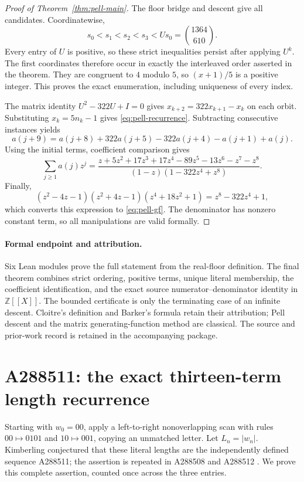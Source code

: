 \documentclass[11pt]{article}
\newcommand{\Z}{\mathbb Z}
\begin{document}
\begin{proof}[Proof of Theorem~\ref{thm:pell-main}]
The floor bridge and descent give all candidates. Coordinatewise,
\[
 s_0<s_1<s_2<s_3<Us_0=\binom{1364}{610}.
\]
Every entry of $U$ is positive, so these strict inequalities persist
after applying $U^k$. The first coordinates therefore occur in exactly
the interleaved order asserted in the theorem. They are congruent to
$4$ modulo $5$, so $(x+1)/5$ is a positive integer. This proves
the exact enumeration, including uniqueness of every index.

The matrix identity $U^2-322U+I=0$ gives
$x_{k+2}=322x_{k+1}-x_k$ on each orbit. Substituting $x_k=5n_k-1$
gives \eqref{eq:pell-recurrence}. Subtracting consecutive instances yields
\[
 a(j+9)=a(j+8)+322a(j+5)-322a(j+4)-a(j+1)+a(j).
\]
Using the initial terms, coefficient comparison gives
\[
 \sum_{j\ge1}a(j)z^j=
 \frac{z+5z^2+17z^3+17z^4-89z^5-13z^6-z^7-z^8}
 {(1-z)(1-322z^4+z^8)}.
\]
Finally,
\[
 (z^2-4z-1)(z^2+4z-1)(z^4+18z^2+1)=z^8-322z^4+1,
\]
which converts this expression to \eqref{eq:pell-gf}. The denominator
has nonzero constant term, so all manipulations are valid formally.
\end{proof}

\paragraph{Formal endpoint and attribution.}
Six Lean modules prove the full statement from the real-floor definition.
The final theorem  combines strict ordering,
positive terms, unique literal membership, the coefficient identification,
and the exact source numerator--denominator identity in $\Z[[X]]$.
The bounded certificate is only the terminating case of an infinite descent.
Cloitre's definition and Barker's formula retain their attribution;
Pell descent and the matrix generating-function method are classical.
The source and prior-work record is retained in the accompanying package.


\section{A288511: the exact thirteen-term length recurrence}
\label{sec:a288511}

Starting with $w_0=00$, apply a left-to-right nonoverlapping scan with
rules $00\mapsto0101$ and $10\mapsto001$, copying an unmatched letter.
Let $L_n=|w_n|$. Kimberling conjectured that these literal lengths are
the independently defined sequence A288511; the assertion is repeated
in A288508 and A288512 \cite{A288511,A288508,A288512}.
We prove this complete assertion, counted once across the three entries.
\end{document}
